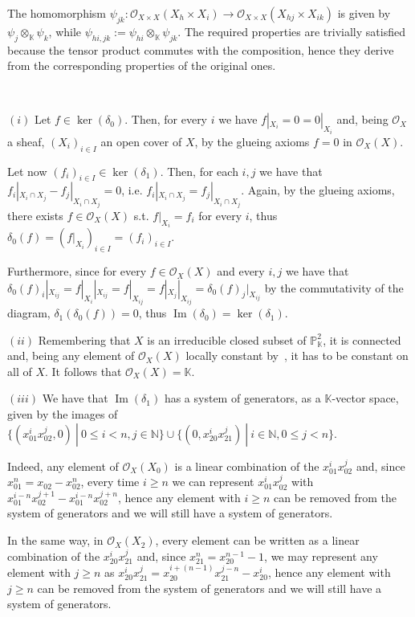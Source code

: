 \documentclass{article}
\newcommand{\numberset}{\mathbb}
\newcommand{\N}{\numberset{N}}
\newcommand{\K}{\numberset{K}}
\newcommand{\Ps}{\mathbb{P}}
\newcommand{\exercise}[1]{\noindent {\bf Exercise #1}}
\DeclareMathOperator{\Ima}{Im}
\begin{document}
The homomorphism $\psi_{jk}:\mathcal{O}_{X\times X}(X_h\times X_i)\rightarrow\mathcal{O}_{X\times X}(X_{hj}\times X_{ik})$ is given by $\psi_j\otimes_{\K}\psi_k$, while $\psi_{hi,jk}:=\psi_{hi}\otimes_{\K}\psi_{jk}$. The required properties are trivially satisfied because the tensor product commutes with the composition, hence they derive from the corresponding properties of the original ones.


~\\
\exercise{6.6.8}

$(i)$ Let $f\in\ker(\delta_0)$. Then, for every $i$ we have $f|_{X_i}=0=0|_{X_i}$ and, being $\mathcal{O}_X$ a sheaf, $(X_i)_{i\in I}$ an open cover of $X$, by the glueing axioms $f=0$ in $\mathcal{O}_X(X)$.

Let now $(f_i)_{i\in I}\in\ker(\delta_1)$. Then, for each $i,j$ we have that $f_i|_{X_i\cap X_j}-f_j|_{X_i\cap X_j}=0$, i.e. $f_i|_{X_i\cap X_j}=f_j|_{X_i\cap X_j}$. Again, by the glueing axioms, there exists $f\in\mathcal{O}_X(X)$ s.t. $f|_{X_i}=f_i$ for every $i$, thus $\delta_0(f)=(f|_{X_i})_{i\in I}=(f_i)_{i\in I}$.

Furthermore, since for every $f\in\mathcal{O}_X(X)$ and every $i,j$ we have that $\delta_0(f)_i|_{X_{ij}}=f|_{X_i}|_{X_{ij}}=f|_{X_{ij}}=f|_{X_j}|_{X_{ij}}=\delta_0(f)_j|_{X_{ij}}$ by the commutativity of the diagram, $\delta_1(\delta_0(f))=0$, thus $\Ima(\delta_0)=\ker(\delta_1)$.

$(ii)$ Remembering that $X$ is an irreducible closed subset of $\Ps^2_{\K}$, it is connected and, being any element of $\mathcal{O}_X(X)$ locally constant by~\cite[thm. 4.2.5]{edix}, it has to be constant on all of $X$. It follows that $\mathcal{O}_X(X)=\K$.

$(iii)$ We have that $\Ima(\delta_1)$ has a system of generators, as a $\K$-vector space, given by the images of $\{(x_{01}^ix_{02}^j,0)\ |\ 0\leq i<n,j\in\N\}\cup\{(0,x_{20}^ix_{21}^j)\ |\ i\in\N, 0\leq j<n\}$.

Indeed, any element of $\mathcal{O}_X(X_0)$ is a linear combination of the $x_{01}^ix_{02}^j$ and, since $x_{01}^n=x_{02}-x_{02}^n$, every time $i\geq n$ we can represent $x_{01}^ix_{02}^j$ with $x_{01}^{i-n}x_{02}^{j+1}-x_{01}^{i-n}x_{02}^{j+n}$, hence any element with $i\geq n$ can be removed from the system of generators and we will still have a system of generators.

In the same way, in $\mathcal{O}_X(X_2)$, every element can be written as a linear combination of the $x_{20}^ix_{21}^j$ and, since $x_{21}^n=x_{20}^{n-1}-1$, we may represent any element with $j\geq n$ as $x_{20}^ix_{21}^j=x_{20}^{i+(n-1)}x_{21}^{j-n}-x_{20}^i$, hence any element with $j\geq n$ can be removed from the system of generators and we will still have a system of generators.
\end{document}
